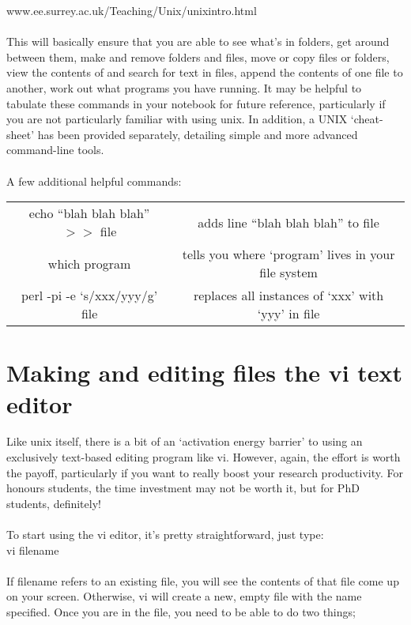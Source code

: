 \documentclass{article}
\begin{document}
www.ee.surrey.ac.uk/Teaching/Unix/unixintro.html\\
\\
\noindent
This will basically ensure that you are able to see what's in folders, get around between them, make and remove folders and files, move or copy files or folders, view the contents of and search for text in files, append the contents of one file to another, work out what programs you have running. It may be helpful to tabulate these commands in your notebook for future reference, particularly if you are not particularly familiar with using unix. In addition, a UNIX `cheat-sheet' has been provided separately, detailing simple and more advanced command-line tools.\\
\\
\noindent
A few additional helpful commands:
\begin{table}[htbp]
\begin{center}
\begin{tabular}{|c|c|}
\hline
echo ``blah blah blah'' $>>$ file	& 	adds line ``blah blah blah'' to file	\\
which program				& 	tells you where `program' lives in your file system \\
perl -pi -e `s/xxx/yyy/g' file		& 	replaces all instances of `xxx' with `yyy' in file	\\
\hline
\end{tabular}
\end{center}
\label{default}
\end{table}%

\section{Making and editing files the vi text editor}

Like unix itself, there is a bit of an `activation energy barrier' to using an exclusively text-based editing program like vi. However, again, the effort is worth the payoff, particularly if you want to really boost your research productivity. For honours students, the time investment may not be worth it, but for PhD students, definitely!\\
\\
\noindent
To start using the vi editor, it's pretty straightforward, just type:\\

vi filename\\
\\
\noindent
If filename refers to an existing file, you will see the contents of that file come up on your screen. Otherwise, vi will create a new, empty file with the name specified. Once you are in the file, you need to be able to do two things; 
\end{document}
